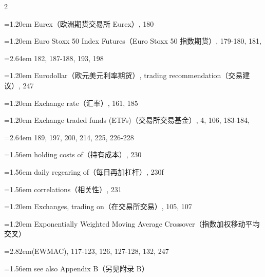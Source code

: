 {\begin{multicols}{2}
\par \noindent\hangindent=1.20em\hspace*{0.00em} Eurex（欧洲期货交易所 Eurex）, 180
\par \noindent\hangindent=1.20em\hspace*{0.00em} Euro Stoxx 50 Index Futures（Euro Stoxx 50 指数期货）, 179-180, 181,
\par \noindent\hangindent=2.64em\hspace*{1.44em} 182, 187-188, 193, 198
\par \noindent\hangindent=1.20em\hspace*{0.00em} Eurodollar（欧元美元利率期货）, trading recommendation（交易建议）, 247
\par \noindent\hangindent=1.20em\hspace*{0.00em} Exchange rate（汇率）, 161, 185
\par \noindent\hangindent=1.20em\hspace*{0.00em} Exchange traded funds (ETFs)（交易所交易基金）, 4, 106, 183-184,
\par \noindent\hangindent=2.64em\hspace*{1.44em} 189, 197, 200, 214, 225, 226-228
\par \noindent\hangindent=1.56em\hspace*{0.36em} holding costs of（持有成本）, 230
\par \noindent\hangindent=1.56em\hspace*{0.36em} daily regearing of（每日再加杠杆）, 230f
\par \noindent\hangindent=1.56em\hspace*{0.36em} correlations（相关性）, 231
\par \noindent\hangindent=1.20em\hspace*{0.00em} Exchanges, trading on（在交易所交易）, 105, 107
\par \noindent\hangindent=1.20em\hspace*{0.00em} Exponentially Weighted Moving Average Crossover（指数加权移动平均交叉）
\par \noindent\hangindent=2.82em\hspace*{1.62em}(EWMAC), 117-123, 126, 127-128, 132, 247
\par \noindent\hangindent=1.56em\hspace*{0.36em} see also Appendix B（另见附录 B）

\end{multicols}}
